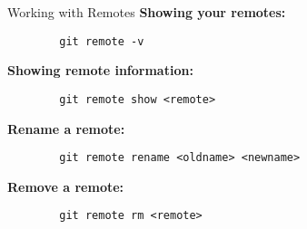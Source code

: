 

\begin{frame}[fragile]{Working with Remotes}
    \textbf{Showing your remotes:}
    \begin{lstlisting}
        git remote -v
    \end{lstlisting}
    \textbf{Showing remote information:}
    \begin{lstlisting}
        git remote show <remote>
    \end{lstlisting}
    \textbf{Rename a remote:}
    \begin{lstlisting}
        git remote rename <oldname> <newname>
    \end{lstlisting}
    \textbf{Remove a remote:}
    \begin{lstlisting}
        git remote rm <remote>
    \end{lstlisting}

\end{frame}

